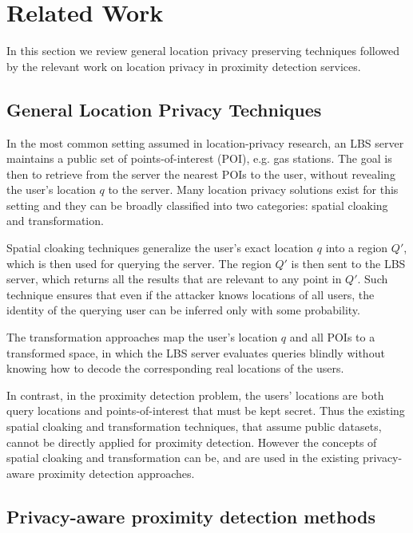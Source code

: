 \section{Related Work} \label{sec:rel_work}
%
In this section we review general location privacy preserving techniques 
followed by the relevant work on location privacy in proximity detection
services.

\subsection{General Location Privacy Techniques}

In the most common setting assumed in location-privacy research,
an LBS server maintains a public set of points-of-interest (POI), e.g. gas
stations. The goal is then to retrieve from the server the nearest POIs to the
user, without revealing the user's location $q$ to the server. Many
location privacy solutions exist for this setting and they can be broadly
classified into two categories: spatial cloaking and transformation. 

Spatial cloaking \cite{gruteser03,mca06,duckham05a,acdvs07} techniques
generalize the user's exact location $q$ into a region $Q'$, which is then used
for querying the server. The region $Q'$ is then sent to the LBS server, which
returns all the results that are relevant to any point in $Q'$. Such technique
ensures that even if the attacker knows locations of all users, the identity of
the querying user can be inferred only with some probability. 

The transformation approaches \cite{ks07,ghinita08} map the user's location $q$
and all POIs to a transformed space, in which the LBS server evaluates queries
blindly without knowing how to decode the corresponding real locations of the
users.

In contrast, in the proximity detection problem, the users' locations are both
query locations and points-of-interest that must be kept secret. Thus the
existing spatial cloaking and transformation techniques, that assume public
datasets, cannot be directly applied for proximity detection. However the
concepts of spatial cloaking and transformation can be, and are used in the
existing privacy-aware proximity detection approaches.

\subsection{Privacy-aware proximity detection methods}

